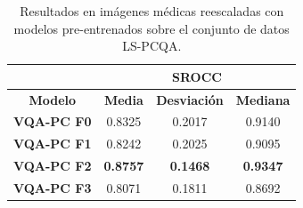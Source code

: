 \begin{table}[H]
  \scriptsize 
  \centering
\begin{tabular}{|c|c|c|c|}
\hline
\rowcolor[HTML]{FFC702}
                       & \multicolumn{3}{c|}{\textbf{SROCC}}                                                                                                          \\ \hline
\rowcolor[HTML]{FFC702}
\textbf{Modelo}    & \textbf{Media} & \textbf{Desviación} & \textbf{Mediana} \\ \hline
\textbf{VQA-PC F0} & 0.8325           & 0.2017              & 0.9140           \\ \hline
\textbf{VQA-PC F1} & 0.8242           & 0.2025              & 0.9095           \\ \hline
\textbf{VQA-PC F2} & \textbf{0.8757}  & \textbf{0.1468}     & \textbf{0.9347}  \\ \hline
\textbf{VQA-PC F3} & 0.8071           & 0.1811              & 0.8692           \\ \hline
\end{tabular}
\caption[Resultados en imágenes médicas reescaladas entrenando en LS-PCQA.]{
  Resultados en imágenes médicas reescaladas con modelos pre-entrenados 
  sobre el conjunto de datos LS-PCQA. 
}\label{tab:LS-PCQA-FN}
\end{table}
